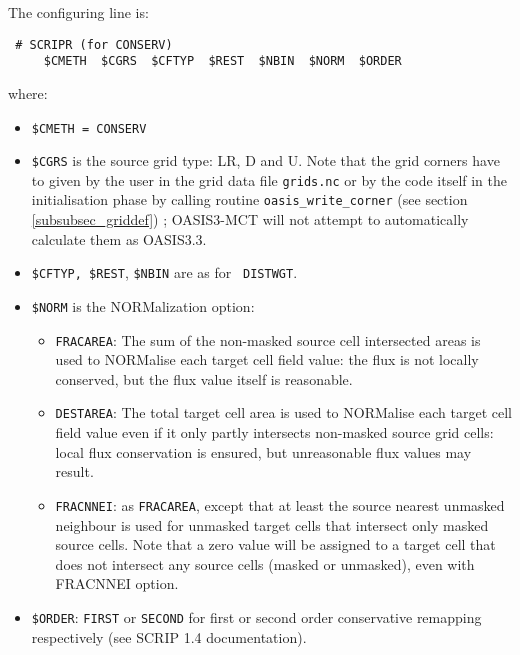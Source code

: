 \begin{itemize}
\begin{itemize}
    The configuring line is:
  \begin{verbatim}
 # SCRIPR (for CONSERV)
     $CMETH  $CGRS  $CFTYP  $REST  $NBIN  $NORM  $ORDER 
\end{verbatim}
    \vspace{-0.5cm} where:
    \begin{itemize}
    \item {\tt \$CMETH = CONSERV}
    \item {\tt \$CGRS} is the source grid type: LR, D and U. Note that
      the grid corners have to given by the user in the grid data file
      {\tt grids.nc} or by the code itself in the initialisation phase
      by calling routine {\tt oasis\_write\_corner} (see section
      \ref{subsubsec_griddef}) ; OASIS3-MCT will not attempt to
      automatically calculate them as OASIS3.3.
    \item {\tt \$CFTYP, \$REST}, {\tt \$NBIN} are as for {\tt
        DISTWGT}.
    \item {\tt \$NORM} is the NORMalization option:
      \begin{itemize}
      \item {\tt FRACAREA}: The sum of the non-masked source cell
        intersected areas is used to NORMalise each target cell field
        value: the flux is not locally conserved, but the flux value
        itself is reasonable.
      \item {\tt DESTAREA}: The total target cell area is used to
        NORMalise each target cell field value even if it only partly
        intersects non-masked source grid cells: local flux
        conservation is ensured, but unreasonable flux values may
        result.
      \item {\tt FRACNNEI}: as {\tt FRACAREA}, except that at least
        the source nearest unmasked neighbour is used for unmasked
        target cells that intersect only masked source cells.  Note
        that a zero value will be assigned to a target cell that does
        not intersect any source cells (masked or unmasked), even with
        FRACNNEI option.
      \end{itemize}
    \item {\tt \$ORDER}: {\tt FIRST} or {\tt SECOND} for first or
      second order conservative remapping respectively (see SCRIP 1.4
      documentation).


\end{itemize}
\end{itemize}
\end{itemize}
